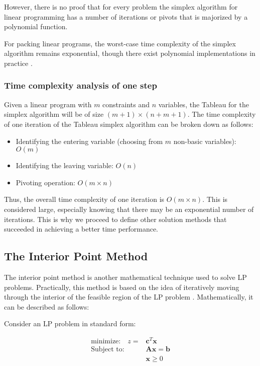 However, there is no proof that for every problem the simplex algorithm for linear programming has a number of iterations or pivots that is majorized by a polynomial function.

For packing linear programs, the worst-case time complexity of the simplex algorithm remains exponential, though there exist polynomial implementations in practice \parencite{stille2010solution}.

\subsubsection{Time complexity analysis of one step}
Given a linear program with \( m \) constraints and \( n \) variables, the Tableau for the
simplex algorithm will be of size \( (m+1) \times (n+m+1) \).
The time complexity of one iteration of the Tableau simplex algorithm can be broken down as follows:

\begin{itemize}
    \item Identifying the entering variable (choosing from $m$ non-basic variables): \( O(m) \)
    \item Identifying the leaving variable: \( O(n) \)
    \item Pivoting operation: \( O(m \times n) \)
\end{itemize}

Thus, the overall time complexity of one iteration is \( O(m \times n) \). This is considered large, especially knowing that there may be an exponential number of iterations. This is why we proceed to define other solution methods that succeeded in achieving a better time performance.

\subsection{The Interior Point Method}
The interior point method is another mathematical technique used to solve LP problems. Practically, this method is based on the idea of iteratively moving through the interior of the feasible region of the LP problem \parencite{alizadeh1995interior}. Mathematically, it can be described as follows:

Consider an LP problem in standard form:

\[
    \begin{aligned}
        \text{minimize:} \quad   z = & \mathbf{c}^T\mathbf{x}   \\
        \text{Subject to:} \quad     & \mathbf{Ax} = \mathbf{b} \\
                                     & \mathbf{x} \geq 0
    \end{aligned}
\]

